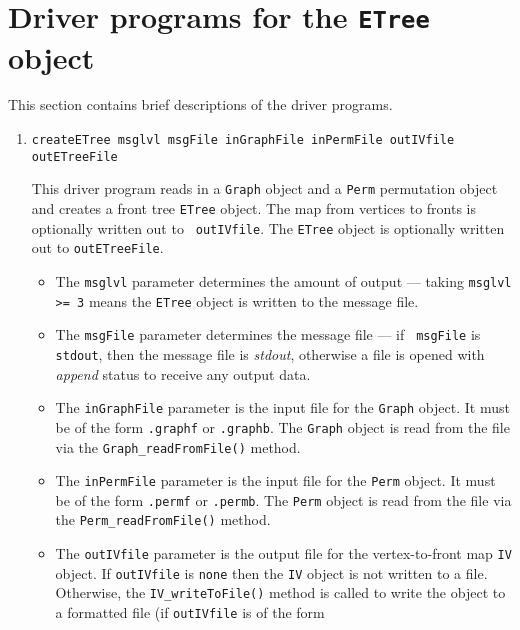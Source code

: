 \par
\section{Driver programs for the {\tt ETree} object}
\label{section:ETree:drivers}
\par
This section contains brief descriptions of the driver programs.
\par
\begin{enumerate}
\item
\begin{verbatim}
createETree msglvl msgFile inGraphFile inPermFile outIVfile outETreeFile
\end{verbatim}
This driver program reads in a {\tt Graph} object and a {\tt Perm}
permutation object and creates a front tree {\tt ETree} object.
The map from vertices to fronts is optionally written out to {\tt
outIVfile}.
The {\tt ETree} object is optionally written out to {\tt outETreeFile}.
\par
\begin{itemize}
\item
The {\tt msglvl} parameter determines the amount of output ---
taking {\tt msglvl >= 3} means the {\tt ETree} object is written
to the message file.
\item
The {\tt msgFile} parameter determines the message file --- if {\tt
msgFile} is {\tt stdout}, then the message file is {\it stdout},
otherwise a file is opened with {\it append} status to receive any
output data.
\item
The {\tt inGraphFile} parameter is the input file for the {\tt Graph}
object. It must be of the form {\tt *.graphf} or {\tt *.graphb}.
The {\tt Graph} object is read from the file via the
{\tt Graph\_readFromFile()} method.
\item
The {\tt inPermFile} parameter is the input file for the {\tt Perm}
object. It must be of the form {\tt *.permf} or {\tt *.permb}.
The {\tt Perm} object is read from the file via the
{\tt Perm\_readFromFile()} method.
\item
The {\tt outIVfile} parameter is the output file for the 
vertex-to-front map {\tt IV} object. 
If {\tt outIVfile} is {\tt none} then the {\tt IV} object is not
written to a file. 
Otherwise, the {\tt IV\_writeToFile()} method is called to write
the object to a formatted file (if {\tt outIVfile} is of the form 

\end{itemize}
\end{enumerate}
